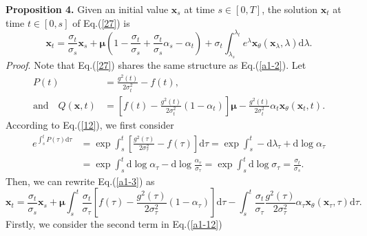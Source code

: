 \textbf{Proposition 4.} Given an initial value $\boldsymbol{x}_s$ at time $s\in[0,T]$, the solution $\boldsymbol{x}_t$ at time $t\in[0,s]$ of Eq.(\ref{27}) is 
\begin{equation}
\boldsymbol{x}_t=\frac{\sigma_t}{\sigma_s}\boldsymbol{x}_s
+\boldsymbol\mu\left(1-\frac{\sigma_t}{\sigma_s}+\frac{\sigma_t}{\sigma_s}\alpha_s-\alpha_t \right)
+\sigma_t\int_{\lambda_s}^{\lambda_t}e^{\lambda}\boldsymbol{x}_\theta(\boldsymbol{x}_\lambda,\lambda)\mathrm{d}\lambda.
\label{prop4}
\end{equation}
\textit{Proof}. Note that Eq.(\ref{27}) shares the same structure as Eq.(\ref{a1-2}). Let
\begin{align*}
P(t)&=\frac{g^2(t)}{2\sigma^2_t}-f(t),\\
\text{and}\quad
Q(\boldsymbol{x},t)&=\left[f(t)-\frac{g^2(t)}{2\sigma_t^2}(1-\alpha_t)\right]\boldsymbol\mu-\frac{g^2(t)}{2\sigma_t^2}\alpha_t\boldsymbol{x}_\theta(\boldsymbol{x}_t,t).
\end{align*}
According to Eq.(\ref{12}), we first consider
\begin{align}
e^{\int_s^tP(\tau)\mathrm{d}\tau}&=\exp{\int_s^t\left[\frac{g^2(\tau)}{2\sigma^2_\tau}-f(\tau)\right]\mathrm{d}\tau}=\exp{\int_s^t-\mathrm{d}\lambda_\tau+\mathrm{d}\log{\alpha_\tau}} \nonumber\\
&=\exp{\int_s^t\mathrm{d}\log{\alpha_\tau}-\mathrm{d}\log{\frac{\alpha_\tau}{\sigma_\tau}}}=\exp{\int_s^t\mathrm{d}\log{\sigma_\tau}}=\frac{\sigma_t}{\sigma_s}.
\label{a1-11}
\end{align}
Then, we can rewrite Eq.(\ref{a1-3}) as
\begin{equation}
\boldsymbol{x}_t=\frac{\sigma_t}{\sigma_s}\boldsymbol{x}_s+
\boldsymbol{\mu}\int_s^t\frac{\sigma_t}{\sigma_\tau}\left[f(\tau)-\frac{g^2(\tau)}{2\sigma_\tau^2}(1-\alpha_\tau)\right]\mathrm{d}\tau
-\int_s^t\frac{\sigma_t}{\sigma_\tau}\frac{g^2(\tau)}{2\sigma_\tau^2}\alpha_\tau\boldsymbol{x}_\theta(\boldsymbol{x}_\tau,\tau)\mathrm{d}\tau.
\label{a1-12}
\end{equation}
Firstly, we consider the second term in Eq.(\ref{a1-12})
